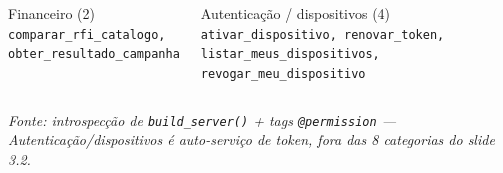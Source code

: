 \documentclass[aspectratio=169,10pt]{beamer}
\begin{document}
\begin{frame}
\begin{columns}[T]
\begin{block}{\tiny\textcolor{mlgreen}{Financeiro} (2)}
      \tiny\texttt{comparar\_rfi\_catalogo, obter\_resultado\_campanha}
    \end{block}
    \vspace{1pt}
    \begin{block}{\tiny\textcolor{mlpurple}{Autenticação / dispositivos} (4)}
      \tiny\texttt{ativar\_dispositivo, renovar\_token,
      listar\_meus\_dispositivos, revogar\_meu\_dispositivo}
    \end{block}
  \end{columns}
  \vspace{1pt}
  {\tiny\itshape Fonte: introspecção de \texttt{build\_server()} + tags
  \texttt{@permission} --- Autenticação/dispositivos é auto-serviço de token,
  fora das 8 categorias do slide 3.2.}
\end{frame}
\end{document}
